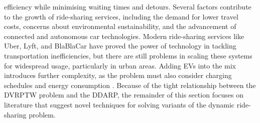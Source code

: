 efficiency while minimising waiting times and detours\cite{dynamic2024model}. Several factors contribute to the growth of ride-sharing services, including the demand for lower travel costs, concerns about environmental sustainability, and the advancement of connected and autonomous car technologies. Modern ride-sharing services like Uber, Lyft, and BlaBlaCar have proved the power of technology in tackling transportation inefficiencies, but there are still problems in scaling these systems for widespread usage, particularly in urban areas\cite{bakibillah2021incentive}. Adding EVs into the mix introduces further complexity, as the problem must also consider charging schedules and energy consumption \cite{abdulaal2017solving}. Because of the tight relationship between the DVRPTW problem and the DDARP, the remainder of this section focuses on literature that suggest novel techniques for solving variants of the dynamic ride-sharing problem. 




